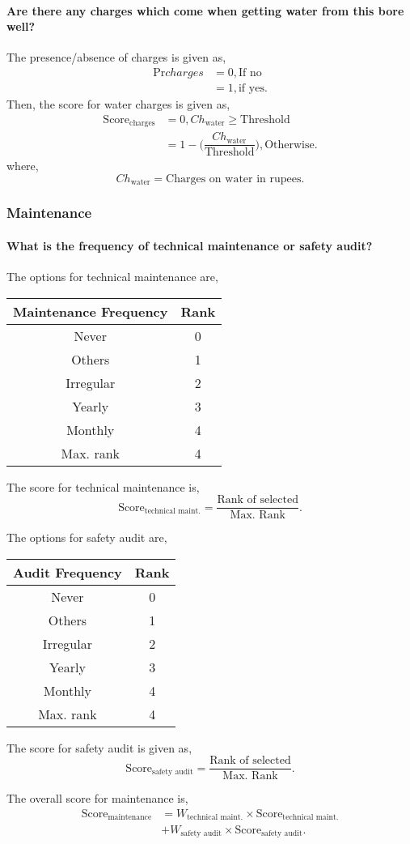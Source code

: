 \documentclass[oneside,twocolumn]{article}
\newcommand{\tsub}[2]{\text{#1}_{\text{#2}}}
\newcommand{\tsubb}[2]{#1_{\text{#2}}}
\newcommand{\dsub}[2]{\dfrac{\text{#1}}{\text{#2}}}
\newenvironment{ttable}
{
\begin{center}
\begin{tabular}{c|c}
\hline
}
{
\\ \hline
\end{tabular}
\end{center}
}
\begin{document}
\paragraph{Are there any charges which come when getting water from this bore well?}
The presence/absence of charges is given as,
\begin{align*}
	\text{Pr}{charges} &= 0, \text{If no} \\
	&= 1, \text{if yes}.
\end{align*}
Then, the score for water charges is given as,
\begin{align*}
	\tsub{Score}{charges} &= 0, \tsubb{Ch}{water} \ge \text{Threshold} \\
	&= 1 - \Big( \dfrac{\tsubb{Ch}{water}}{\text{Threshold}} \Big), \text{Otherwise}.
\end{align*}
where,
\[
	\tsubb{Ch}{water} = \text{Charges on water in rupees}.
\]
\subsubsection{Maintenance}
\paragraph{What is the frequency of technical maintenance or safety audit?}
The options for technical maintenance are,
\begin{ttable}
	Maintenance Frequency & Rank \\ \hline
	Never & 0 \\
	Others & 1 \\
	Irregular & 2 \\
	Yearly & 3 \\
	Monthly & 4 \\ \hline
	Max. rank & 4 
\end{ttable}
The score for technical maintenance is,
\[
	\tsub{Score}{technical maint.} = \dsub{Rank of selected}{Max. Rank}.
\]

The options for safety audit are,
\begin{ttable}
	Audit Frequency & Rank \\ \hline
	Never & 0 \\
	Others & 1 \\
	Irregular & 2 \\
	Yearly & 3 \\
	Monthly & 4 \\ \hline
	Max. rank & 4 
\end{ttable}
The score for safety audit is given as,
\[
	\tsub{Score}{safety audit} = \dsub{Rank of selected}{Max. Rank}.
\]

The overall score for maintenance is,
\begin{align*}
	\tsub{Score}{maintenance} &= \tsubb{W}{technical maint.} \times \tsub{Score}{technical maint.} \\
	&+ \tsubb{W}{safety audit} \times \tsub{Score}{safety audit}.
\end{align*}
\end{document}
